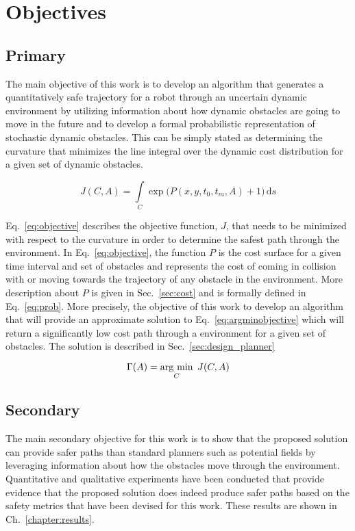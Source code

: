 


\chapter{Objectives}

\label{chapter:objectives}

\section{Primary}

The main objective of this work is to develop an algorithm that generates a
quantitatively safe trajectory for a robot through an uncertain dynamic
environment by utilizing information about how dynamic obstacles are going to
move in the future and to develop a formal probabilistic representation of
stochastic dynamic obstacles. This can be simply stated as determining the
curvature that minimizes the line integral over the dynamic cost distribution
for a given set of dynamic obstacles.

\begin{equation}
    J(C, A) = \int \limits_{C} \exp{\Big(P(x, y, t_0, t_m, A) + 1\Big)} \,
    \mathrm{d}s
    \label{eq:objective}
\end{equation}

Eq.~\ref{eq:objective} describes the objective function, $J$, that needs to be
minimized with respect to the curvature in order to determine the safest path
through the environment. In Eq.~\ref{eq:objective}, the function $P$ is the
cost surface for a given time interval and set of obstacles and represents the
cost of coming in collision with or moving towards the trajectory of any
obstacle in the environment. More description about $P$ is given in
Sec.~\ref{sec:cost} and is formally defined in Eq.~\ref{eq:prob}.  More
precisely, the objective of this work to develop an algorithm that will provide
an approximate solution to Eq.~\ref{eq:argminobjective} which will return a
significantly low cost path through a environment for a given set of obstacles.
The solution is described in Sec.~\ref{sec:design_planner}

\begin{equation}
    \Gamma(A) = \underset{C}{\operatorname{arg}\,\operatorname{min}}\; \, J(C, A)
    \label{eq:argminobjective}
\end{equation}

\section{Secondary}

The main secondary objective for this work is to show that the proposed
solution can provide safer paths than standard planners such as potential
fields by leveraging information about how the obstacles move through the
environment. Quantitative and qualitative experiments have been conducted that
provide evidence that the proposed solution does indeed produce safer paths
based on the safety metrics that have been devised for this work. These results
are shown in Ch.~\ref{chapter:results}.


